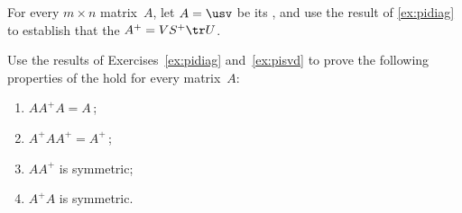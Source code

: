 \begin{exercise} \label{ex:pisvd} 
For every \(m\times n\) matrix~\(A\), let \(A=\usv\) be its \svd, and use the result of \autoref{ex:pidiag} to establish that the  \(A^+=VS^+\tr U\).
\end{exercise}



\begin{exercise} \label{ex:} 
Use the results of Exercises~\ref{ex:pidiag} and~\ref{ex:pisvd} to prove the following properties of the  hold for every matrix~\(A\):
\begin{enumerate}
\item \(AA^+A=A\)\,;
\item \(A^+AA^+=A^+\)\,;
\item \(AA^+\) is symmetric;
\item \(A^+A\) is symmetric.
\end{enumerate}
\end{exercise}







